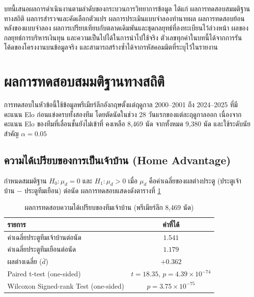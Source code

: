 
บทนี้เสนอผลการดำเนินงานตามลำดับของกระบวนการวิทยาการข้อมูล ได้แก่ ผลการทดสอบสมมติฐานทางสถิติ ผลการสำรวจและคัดเลือกตัวแปร ผลการประเมินแบบจำลองทำนายผล ผลการทดสอบย้อนหลังของแบบจำลอง ผลการเปรียบเทียบกับตลาดเดิมพันและชุดกลยุทธ์ที่ลงทะเบียนไว้ล่วงหน้า ผลของกลยุทธ์การบริหารเงินทุน และความเป็นไปได้ในการนำไปใช้จริง ตัวเลขทุกค่าในบทนี้ได้จากการรันโค้ดของโครงงานบนข้อมูลจริง และสามารถสร้างซ้ำได้จากรหัสคอมมิตที่ระบุไว้ในรายงาน

\section{ผลการทดสอบสมมติฐานทางสถิติ}

การทดสอบในหัวข้อนี้ใช้ข้อมูลพรีเมียร์ลีกอังกฤษตั้งแต่ฤดูกาล 2000--2001 ถึง 2024--2025 ที่มีคะแนน Elo ก่อนแข่งครบทั้งสองทีม โดยตัดนัดในช่วง 28 วันแรกของแต่ละฤดูกาลออก เนื่องจากคะแนน Elo ของทีมที่เลื่อนชั้นยังไม่เข้าที่ คงเหลือ 8,469 นัด จากทั้งหมด 9,380 นัด และใช้ระดับนัยสำคัญ $\alpha = 0.05$

\subsection{ความได้เปรียบของการเป็นเจ้าบ้าน (Home Advantage)}

กำหนดสมมติฐาน $H_0: \mu_d = 0$ และ $H_1: \mu_d > 0$ เมื่อ $\mu_d$ คือค่าเฉลี่ยของผลต่างประตู (ประตูเจ้าบ้าน $-$ ประตูทีมเยือน) ต่อนัด ผลการทดสอบแสดงดังตารางที่ \ref{tab:home_advantage}

\begin{table}[htbp]
\centering
\caption{ผลการทดสอบความได้เปรียบของทีมเจ้าบ้าน (พรีเมียร์ลีก 8,469 นัด)}
\label{tab:home_advantage}
\begin{tabular}{|l|c|}
\hline
\textbf{รายการ} & \textbf{ค่าที่ได้} \\
\hline
ค่าเฉลี่ยประตูทีมเจ้าบ้านต่อนัด & $1.541$ \\
ค่าเฉลี่ยประตูทีมเยือนต่อนัด & $1.179$ \\
ผลต่างเฉลี่ย ($\bar{d}$) & $+0.362$ \\
Paired t-test (one-sided) & $t = 18.35$, $p = 4.39 \times 10^{-74}$ \\
Wilcoxon Signed-rank Test (one-sided) & $p = 3.75 \times 10^{-75}$ \\
\hline
\end{tabular}
\end{table}

